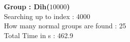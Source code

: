 \textbf{Group : Dih($10000$)}\\
Searching up to index : 4000\\
How many normal groups are found : 25\\
Total Time in s : 462.9\\
